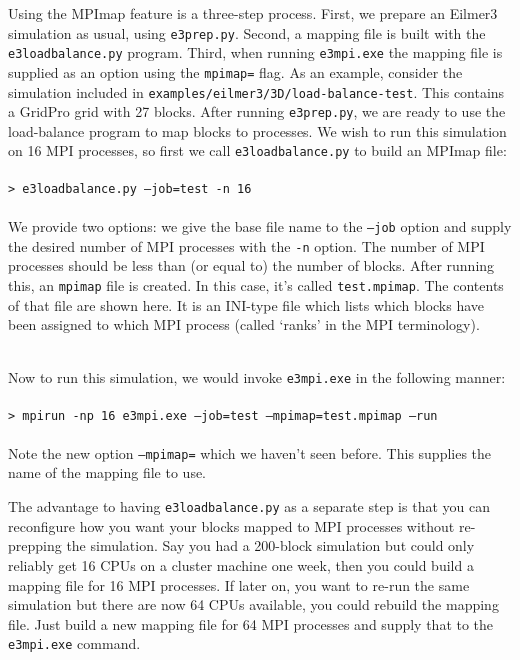 Using the MPImap feature is a three-step process.
First, we prepare an Eilmer3 simulation as usual, using \texttt{e3prep.py}.
Second, a mapping file is built with the \texttt{e3loadbalance.py}
program.
Third, when running \texttt{e3mpi.exe} the mapping file
is supplied as an option using the \texttt{mpimap=} flag.
As an example, consider the simulation included
in \newline \texttt{examples/eilmer3/3D/load-balance-test}.
This contains a GridPro grid with 27 blocks.
After running \texttt{e3prep.py}, we are ready to use the
load-balance program to map blocks to processes.
We wish to run this simulation on 16 MPI processes,
so first we call \texttt{e3loadbalance.py} to build an MPImap file:\\
%
\topbar\\
\texttt{> e3loadbalance.py --job=test -n 16}\\
\bottombar\\
%
We provide two options: we give the base file name to the \texttt{--job} option
and supply the desired number of MPI processes with the \texttt{-n} option.
The number of MPI processes should be less than (or equal to) the number
of blocks.
After running this, an \texttt{mpimap} file is created.
In this case, it's called \texttt{test.mpimap}.
The contents of that file are shown here.
It is an INI-type file which lists which blocks have been assigned
to which MPI process (called `ranks' in the MPI terminology).\\
\topbar

\bottombar\\
Now to run this simulation, we would invoke \texttt{e3mpi.exe} in
the following manner:\\
%
\topbar\\
\texttt{> mpirun -np 16 e3mpi.exe --job=test --mpimap=test.mpimap --run}\\
\bottombar\\
%
Note the new option \texttt{--mpimap=} which we haven't seen before.
This supplies the name of the mapping file to use.

The advantage to having \texttt{e3loadbalance.py} as a separate step
is that you can reconfigure how you want your blocks mapped to MPI processes
without re-prepping the simulation.
Say you had a 200-block simulation but could only reliably get 16 CPUs
on a cluster machine one week, then you could build a mapping file for
16 MPI processes.
If later on, you want to re-run the same simulation but there
are now 64 CPUs available, you could rebuild the mapping file.
Just build a new mapping file for 64 MPI processes and
supply that to the \texttt{e3mpi.exe} command.

